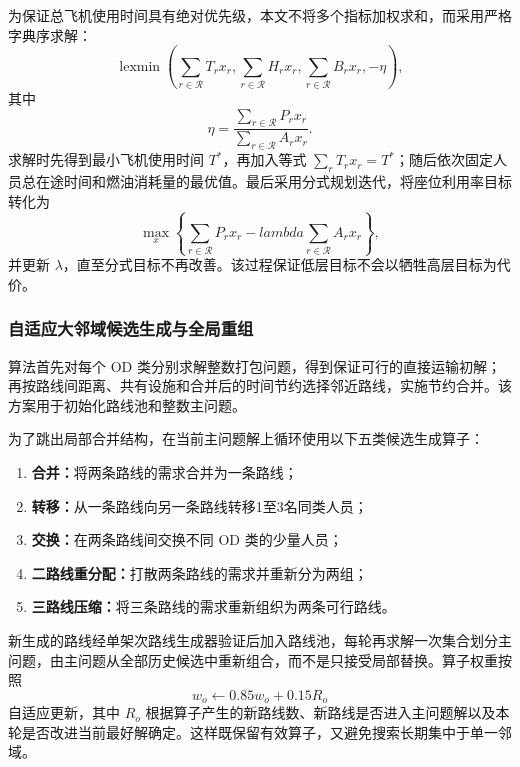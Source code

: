 \documentclass[UTF-8,a4paper,zihao=-4]{ctexart}
\begin{document}
为保证总飞机使用时间具有绝对优先级，本文不将多个指标加权求和，而采用严格字典序求解：
\begin{equation}
 \operatorname{lexmin}
 \left(
 \sum_{r\in\mathcal R}T_rx_r,
 \sum_{r\in\mathcal R}H_rx_r,
 \sum_{r\in\mathcal R}B_rx_r,
 -\eta
 \right),
\end{equation}
其中
\begin{equation}
 \eta=
 \frac{\sum_{r\in\mathcal R}P_rx_r}
 {\sum_{r\in\mathcal R}A_rx_r}.
\end{equation}
求解时先得到最小飞机使用时间 $T^{*}$，再加入等式
$\sum_rT_rx_r=T^{*}$；随后依次固定人员总在途时间和燃油消耗量的最优值。最后采用分式规划迭代，将座位利用率目标转化为
\begin{equation}
 \max_{x}\left\{
 \sum_{r\in\mathcal R}P_rx_r-lambda
 \sum_{r\in\mathcal R}A_rx_r
 \right\},
\end{equation}
并更新 $\lambda$，直至分式目标不再改善。该过程保证低层目标不会以牺牲高层目标为代价。

\subsubsection{自适应大邻域候选生成与全局重组}

算法首先对每个 OD 类分别求解整数打包问题，得到保证可行的直接运输初解；再按路线间距离、共有设施和合并后的时间节约选择邻近路线，实施节约合并。该方案用于初始化路线池和整数主问题。

为了跳出局部合并结构，在当前主问题解上循环使用以下五类候选生成算子：
\begin{enumerate}
    \item \textbf{合并：}将两条路线的需求合并为一条路线；
    \item \textbf{转移：}从一条路线向另一条路线转移1至3名同类人员；
    \item \textbf{交换：}在两条路线间交换不同 OD 类的少量人员；
    \item \textbf{二路线重分配：}打散两条路线的需求并重新分为两组；
    \item \textbf{三路线压缩：}将三条路线的需求重新组织为两条可行路线。
\end{enumerate}
新生成的路线经单架次路线生成器验证后加入路线池，每轮再求解一次集合划分主问题，由主问题从全部历史候选中重新组合，而不是只接受局部替换。算子权重按照
\begin{equation}
 w_o\leftarrow0.85w_o+0.15R_o
\end{equation}
自适应更新，其中 $R_o$ 根据算子产生的新路线数、新路线是否进入主问题解以及本轮是否改进当前最好解确定。这样既保留有效算子，又避免搜索长期集中于单一邻域。
\end{document}

